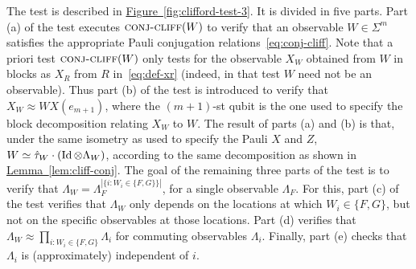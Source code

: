 \documentclass[11pt]{article}
\numberwithin{equation}{section}
\theoremstyle{definition}
\theoremstyle{plain}
\newcommand{\expref}[2]{\hyperref[#2]{#1~\ref{#2}}}
\newcommand{\Id}{\ensuremath{\mathop{\rm Id}\nolimits}}
\newcommand{\conjc}{\textsc{conj-cliff}}
\newcommand{\phase}{\Lambda}
\begin{document}
The test is described in \expref{Figure}{fig:clifford-test-3}. It is divided in five
parts. Part (a) of the test executes  $\conjc(W)$ to verify that an observable
$W\in\Sigma^m$ satisfies the appropriate Pauli conjugation
relations~\eqref{eq:conj-cliff}. Note that a priori test $\conjc(W)$ only tests
for the observable $X_W$ obtained from $W$ in blocks as $X_R$ from $R$
in~\eqref{eq:def-xr} (indeed, in that test $W$ need not be an observable). Thus
part (b) of the test is introduced to verify that $X_W \approx W X(e_{m+1})$, where the $(m+1)$-st qubit is the one used to specify the block decomposition relating $X_W$ to $W$.  The result of parts (a) and (b) is that, under the same isometry as used to specify the Pauli $X$ and $Z$, $W\simeq \hat{\tau}_W \cdot (\Id\otimes \phase_W)$, according to the same decomposition as shown in \expref{Lemma}{lem:cliff-conj}. The goal of the remaining three parts of the test is to verify that $\phase_W = \phase_F^{|\{i: W_i \in \{F,G\}\}|}$, for a single observable $\phase_F$. For this, part (c) of the test verifies that $\phase_W$ only depends on the locations at which $W_i\in\{F,G\}$, but not on the specific observables at those locations. Part (d) verifies that $\phase_W \approx \prod_{i: W_i\in \{F,G\}} \phase_i $ for commuting observables $\phase_i$. Finally, part (e) checks that $\phase_i$ is (approximately) independent of $i$. 
\end{document}
